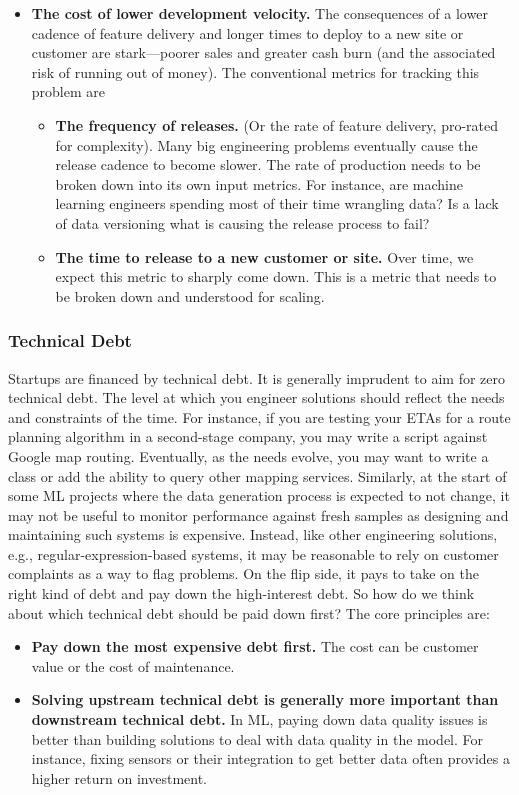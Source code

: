 \documentclass[12pt, letterpaper]{article}
\begin{document}
\begin{itemize}
\item \textbf{The cost of lower development velocity.} The consequences of a lower cadence of feature delivery and longer times to deploy to a new site or customer are stark—poorer sales and greater cash burn (and the associated risk of running out of money). The conventional metrics for tracking this problem are
    \begin{itemize}
        \item \textbf{The frequency of releases.} (Or the rate of feature delivery, pro-rated for complexity). Many big engineering problems eventually cause the release cadence to become slower. The rate of production needs to be broken down into its own input metrics. For instance, are machine learning engineers spending most of their time wrangling data? Is a lack of data versioning what is causing the release process to fail?
    
    \item \textbf{The time to release to a new customer or site.} Over time, we expect this metric to sharply come down. This is a metric that needs to be broken down and understood for scaling. 
    \end{itemize}
\end{itemize}

\subsubsection{Technical Debt}
Startups are financed by technical debt. It is generally imprudent to aim for zero technical debt. The level at which you engineer solutions should reflect the needs and constraints of the time. For instance, if you are testing your ETAs for a route planning algorithm in a second-stage company, you may write a script against Google map routing. Eventually, as the needs evolve, you may want to write a class or add the ability to query other mapping services. Similarly, at the start of some ML projects where the data generation process is expected to not change,  it may not be useful to monitor performance against fresh samples as designing and maintaining such systems is expensive. Instead, like other engineering solutions, e.g., regular-expression-based systems, it may be reasonable to rely on customer complaints as a way to flag problems. On the flip side, it pays to take on the right kind of debt and pay down the high-interest debt. So how do we think about which technical debt should be paid down first? The core principles are:
\begin{itemize}
    \item \textbf{Pay down the most expensive debt first.} The cost can be customer value or the cost of maintenance.
    \item \textbf{Solving upstream technical debt is generally more important than downstream technical debt.} In ML, paying down data quality issues is better than building solutions to deal with data quality in the model. For instance, fixing sensors or their integration to get better data often provides a higher return on investment.
\end{itemize}
\end{document}
